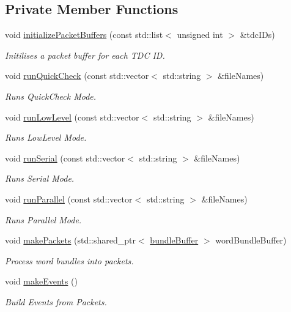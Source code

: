 \subsection*{Private Member Functions}
\begin{DoxyCompactItemize}
\item 
void \hyperlink{class_processor_aa9ad1e9d6f3d217e23649e42cd07de90}{initialize\+Packet\+Buffers} (const std\+::list$<$ unsigned int $>$ \&tdc\+I\+Ds)
\begin{DoxyCompactList}\small\item\em Initilises a packet buffer for each T\+DC ID. \end{DoxyCompactList}\item 
void \hyperlink{class_processor_ae045ebe853cd1f2124ecb93b829a9113}{run\+Quick\+Check} (const std\+::vector$<$ std\+::string $>$ \&file\+Names)
\begin{DoxyCompactList}\small\item\em Runs Quick\+Check Mode. \end{DoxyCompactList}\item 
void \hyperlink{class_processor_ae697c1dd3136d1cf973d0ecc5a65a53a}{run\+Low\+Level} (const std\+::vector$<$ std\+::string $>$ \&file\+Names)
\begin{DoxyCompactList}\small\item\em Runs Low\+Level Mode. \end{DoxyCompactList}\item 
void \hyperlink{class_processor_a7475d40a755f8afa7b6746c7949454d9}{run\+Serial} (const std\+::vector$<$ std\+::string $>$ \&file\+Names)
\begin{DoxyCompactList}\small\item\em Runs Serial Mode. \end{DoxyCompactList}\item 
void \hyperlink{class_processor_a1e5a47f8539e3568e2ba8f14f1fddea2}{run\+Parallel} (const std\+::vector$<$ std\+::string $>$ \&file\+Names)
\begin{DoxyCompactList}\small\item\em Runs Parallel Mode. \end{DoxyCompactList}\item 
void \hyperlink{class_processor_a554de487c5e8205872151fbedb315291}{make\+Packets} (std\+::shared\+\_\+ptr$<$ \hyperlink{class_processor_a531b4c5f7c0d810fc6e9e1dd3d115725}{bundle\+Buffer} $>$ word\+Bundle\+Buffer)
\begin{DoxyCompactList}\small\item\em Process word bundles into packets. \end{DoxyCompactList}\item 
void \hyperlink{class_processor_ae06672fc3ac6ef73525b64d4f9f769e7}{make\+Events} ()
\begin{DoxyCompactList}\small\item\em Build Events from Packets. \end{DoxyCompactList}\end{DoxyCompactItemize}

